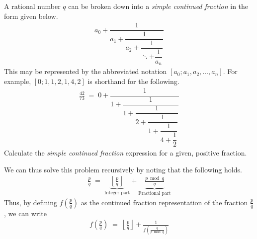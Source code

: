 

\problem A rational number $q$ can be broken down into a \textit{simple continued fraction} in the form given below.
\begin{align*}
	a_0 + \dfrac{1}{a_1 + \dfrac{1}{a_2 + \dfrac{1}{\ddots + \dfrac{1}{a_n}}}}
\end{align*}
This may be represented by the abbreviated notation $[a_0; a_1, a_2, \dots, a_n]$. For example, $[0; 1, 1, 2, 1, 4, 2]$ is shorthand for the following.
\begin{align*}
	\frac{42}{73} \;=\; 0 + \dfrac{1}{1 + \dfrac{1}{1 + \dfrac{1}{2 + \dfrac{1}{1 + \dfrac{1}{4 + \dfrac{1}{2}}}}}}
\end{align*}
Calculate the \textit{simple continued fraction} expression for a given, positive fraction.

\solution
We can thus solve this problem recursively by noting that the following holds.
\begin{align*}
	\frac{p}{q} \;=\;\!\!\! \underbrace{\left\lfloor \frac{p}{q} \right\rfloor}_{\text{Integer part}} 
			\!\!\!	+ \underbrace{\frac{p \bmod q}{q}}_{\text{Fractional part}}
\end{align*}
Thus, by defining $f(\frac{p}{q})$ as the continued fraction representation of the fraction $\frac{p}{q}$, we can write
\begin{align*}
	f \left( \frac{p}{q} \right) \;=\; \left\lfloor \frac{p}{q} \right\rfloor + \frac{1}{f \left( \frac{q}{p \bmod q} \right)}
\end{align*}
